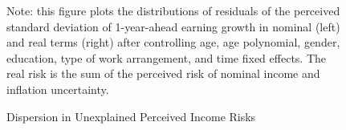     \begin{figure}[!ht]
    \caption{Dispersion in Unexplained Perceived Income Risks}
    \label{fig:histmoms}
	\begin{center}
\end{center}
    \begin{flushleft}Note: this figure plots the distributions of residuals of the perceived standard deviation of 1-year-ahead earning growth in nominal (left) and real terms (right) after controlling age, age polynomial, gender, education, type of work arrangement, and time fixed effects. The real risk is the sum of the perceived risk of nominal income and inflation uncertainty.\end{flushleft}
    \end{figure}
    
